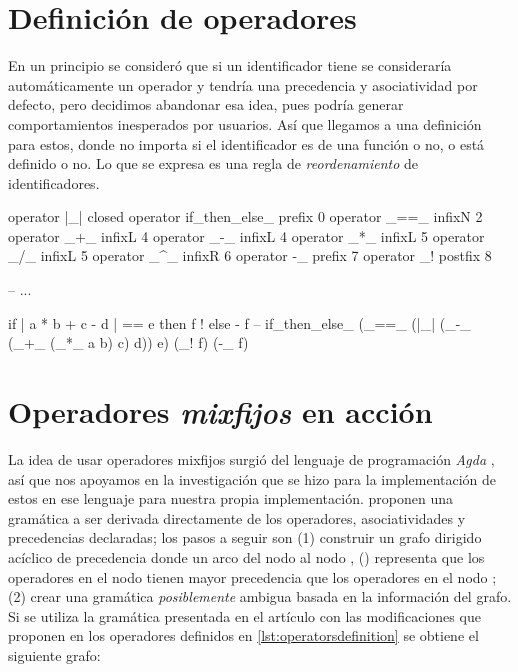 {\section{Definición de operadores}

\begin{designfr}
En un principio se consideró que si un identificador tiene \inlinecode{\_} se consideraría automáticamente un operador y tendría una precedencia y asociatividad por defecto, pero decidimos abandonar esa idea, pues podría generar comportamientos inesperados por usuarios. Así que llegamos a una definición para estos, donde no importa si el identificador es de una función o no, o está definido o no. Lo que se expresa es una regla de \emph{reordenamiento} de identificadores.

\begin{anglercode}[label=lst:operatorsdefinition]
operator |_|                closed
operator if_then_else_      prefix  0
operator _==_               infixN  2
operator _+_                infixL  4
operator _-_                infixL  4
operator _*_                infixL  5
operator _/_                infixL  5
operator _^_                infixR  6
operator -_                 prefix  7
operator _!                 postfix 8

-- ...

if | a * b + c - d | == e then f ! else - f
-- if_then_else_ (_==_ (|_| (_-_ (_+_ (_*_ a b) c) d)) e) (_! f) (-_ f)
\end{anglercode}
\end{designfr}

\section{Operadores \emph{mixfijos} en acción}

\begin{investigationfr}
La idea de usar operadores mixfijos surgió del lenguaje de programación \emph{Agda} \cite{agda}, así que nos apoyamos en la investigación que se hizo para la implementación de estos en ese lenguaje para nuestra propia implementación. \textcite{parsing-mixfix-operators} proponen una gramática a ser derivada directamente de los operadores, asociatividades y precedencias declaradas; los pasos a seguir son (1) construir un grafo dirigido acíclico de precedencia donde un arco del nodo  al nodo , () representa que los operadores en el nodo  tienen mayor precedencia que los operadores en el nodo ; (2) crear una gramática \emph{posiblemente} ambigua basada en la información del grafo. Si se utiliza la gramática presentada en el artículo con las modificaciones que proponen en los operadores definidos en \ref{lst:operatorsdefinition} se obtiene el siguiente grafo:


\end{investigationfr}}
